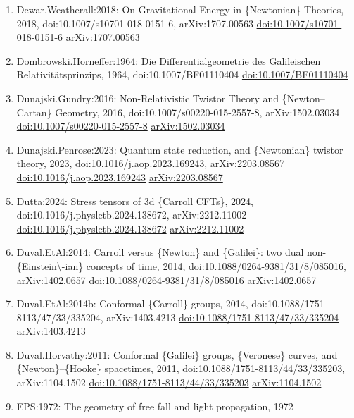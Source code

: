 \documentclass[11pt]{article}
\begin{document}
\begin{enumerate}[leftmargin=*]
  \item Dewar.Weatherall:2018: On Gravitational Energy in \{Newtonian\} Theories, 2018, doi:10.1007/s10701-018-0151-6, arXiv:1707.00563 \href{https://doi.org/10.1007/s10701-018-0151-6}{doi:10.1007/s10701-018-0151-6} \href{https://arxiv.org/abs/1707.00563}{arXiv:1707.00563}
  \item Dombrowski.Horneffer:1964: Die Differentialgeometrie des Galileischen Relativitätsprinzips, 1964, doi:10.1007/BF01110404 \href{https://doi.org/10.1007/BF01110404}{doi:10.1007/BF01110404}
  \item Dunajski.Gundry:2016: Non-Relativistic Twistor Theory and \{Newton--Cartan\} Geometry, 2016, doi:10.1007/s00220-015-2557-8, arXiv:1502.03034 \href{https://doi.org/10.1007/s00220-015-2557-8}{doi:10.1007/s00220-015-2557-8} \href{https://arxiv.org/abs/1502.03034}{arXiv:1502.03034}
  \item Dunajski.Penrose:2023: Quantum state reduction, and \{Newtonian\} twistor theory, 2023, doi:10.1016/j.aop.2023.169243, arXiv:2203.08567 \href{https://doi.org/10.1016/j.aop.2023.169243}{doi:10.1016/j.aop.2023.169243} \href{https://arxiv.org/abs/2203.08567}{arXiv:2203.08567}
  \item Dutta:2024: Stress tensors of 3d \{Carroll CFTs\}, 2024, doi:10.1016/j.physletb.2024.138672, arXiv:2212.11002 \href{https://doi.org/10.1016/j.physletb.2024.138672}{doi:10.1016/j.physletb.2024.138672} \href{https://arxiv.org/abs/2212.11002}{arXiv:2212.11002}
  \item Duval.EtAl:2014: Carroll versus \{Newton\} and \{Galilei\}: two dual non-\{Einstein\textbackslash{}-ian\} concepts of time, 2014, doi:10.1088/0264-9381/31/8/085016, arXiv:1402.0657 \href{https://doi.org/10.1088/0264-9381/31/8/085016}{doi:10.1088/0264-9381/31/8/085016} \href{https://arxiv.org/abs/1402.0657}{arXiv:1402.0657}
  \item Duval.EtAl:2014b: Conformal \{Carroll\} groups, 2014, doi:10.1088/1751-8113/47/33/335204, arXiv:1403.4213 \href{https://doi.org/10.1088/1751-8113/47/33/335204}{doi:10.1088/1751-8113/47/33/335204} \href{https://arxiv.org/abs/1403.4213}{arXiv:1403.4213}
  \item Duval.Horvathy:2011: Conformal \{Galilei\} groups, \{Veronese\} curves, and \{Newton\}--\{Hooke\} spacetimes, 2011, doi:10.1088/1751-8113/44/33/335203, arXiv:1104.1502 \href{https://doi.org/10.1088/1751-8113/44/33/335203}{doi:10.1088/1751-8113/44/33/335203} \href{https://arxiv.org/abs/1104.1502}{arXiv:1104.1502}
  \item EPS:1972: The geometry of free fall and light propagation, 1972

\end{enumerate}
\end{document}
